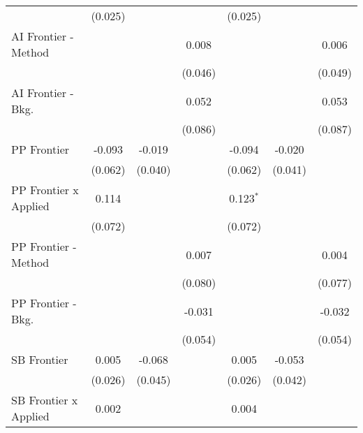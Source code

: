 \begin{tabular}{lcccccc}
                                & (0.025)        &               &                & (0.025)        &              &   \\   
   AI Frontier - Method         &                &               & 0.008          &                &              & 0.006\\   
                                &                &               & (0.046)        &                &              & (0.049)\\   
   AI Frontier - Bkg.           &                &               & 0.052          &                &              & 0.053\\   
                                &                &               & (0.086)        &                &              & (0.087)\\   
   PP Frontier                  & -0.093         & -0.019        &                & -0.094         & -0.020       &   \\   
                                & (0.062)        & (0.040)       &                & (0.062)        & (0.041)      &   \\   
   PP Frontier x Applied        & 0.114          &               &                & 0.123$^{*}$    &              &   \\   
                                & (0.072)        &               &                & (0.072)        &              &   \\   
   PP Frontier - Method         &                &               & 0.007          &                &              & 0.004\\   
                                &                &               & (0.080)        &                &              & (0.077)\\   
   PP Frontier - Bkg.           &                &               & -0.031         &                &              & -0.032\\   
                                &                &               & (0.054)        &                &              & (0.054)\\   
   SB Frontier                  & 0.005          & -0.068        &                & 0.005          & -0.053       &   \\   
                                & (0.026)        & (0.045)       &                & (0.026)        & (0.042)      &   \\   
   SB Frontier x Applied        & 0.002          &               &                & 0.004          &              &   \\   

\end{tabular}
